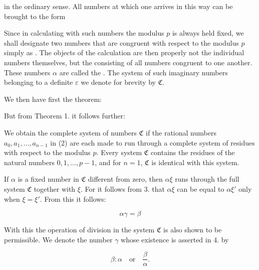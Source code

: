 in the ordinary sense. All numbers at which one arrives in this way can be brought to the form


Since in calculating with such numbers the modulus $p$ is always held fixed, we shall designate two numbers that are congruent with respect to the modulus $p$ simply as . The objects of the calculation are then properly not the individual numbers themselves, but the  consisting of all numbers congruent to one another. These numbers $\alpha$ are called the . The system of such imaginary numbers belonging to a definite $\varepsilon$ we denote for brevity by $\mathfrak{C}$.

We then have first the theorem:


But from Theorem 1. it follows further:


We obtain the complete system of numbers $\mathfrak{C}$ if the rational numbers $a_0, a_1, \ldots, a_{n-1}$ in (2) are each made to run through a complete system of residues with respect to the modulus $p$. Every system $\mathfrak{C}$ contains the residues of the natural numbers $0, 1, \ldots, p-1$, and for $n = 1$, $\mathfrak{C}$ is identical with this system.

If $\alpha$ is a fixed number in $\mathfrak{C}$ different from zero, then $\alpha\xi$ runs through the full system $\mathfrak{C}$ together with $\xi$. For it follows from 3. that $\alpha\xi$ can be equal to $\alpha\xi'$ only when $\xi = \xi'$. From this it follows:


\[
\alpha\gamma = \beta
\]


With this the operation of division in the system $\mathfrak{C}$ is also shown to be permissible. We denote the number $\gamma$ whose existence is asserted in 4. by

\[
\beta : \alpha \quad \text{or} \quad \frac{\beta}{\alpha}.
\]
